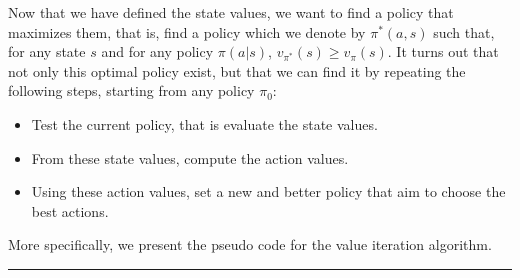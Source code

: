 \documentclass[
  letterpaper,
]{report}
\providecommand{\tightlist}{%
  \setlength{\itemsep}{0pt}\setlength{\parskip}{0pt}}\usepackage{longtable,booktabs,array}
\theoremstyle{plain}
\theoremstyle{definition}
\theoremstyle{definition}
\theoremstyle{remark}
\begin{document}
Now that we have defined the state values, we want to find a policy that
maximizes them, that is, find a policy which we denote by \(\pi^*(a,s)\)
such that, for any state \(s\) and for any policy \(\pi(a|s)\),
\(v_{\pi^*}(s)\geq v_\pi(s)\). It turns out that not only this optimal
policy exist, but that we can find it by repeating the following steps,
starting from any policy \(\pi_0\):

\begin{itemize}
\tightlist
\item
  Test the current policy, that is evaluate the state values.
\item
  From these state values, compute the action values.
\item
  Using these action values, set a new and better policy that aim to
  choose the best actions.
\end{itemize}

More specifically, we present the pseudo code for the value iteration
algorithm.

\begin{center}\rule{0.5\linewidth}{0.5pt}\end{center}
\end{document}
